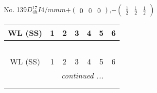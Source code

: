 \documentclass[fleqn,9pt,landscape]{jsarticle}
\begin{document}
\newpage
No. 139\quad$D_{4h}^{17}$\quad$I4/mmm$\quad[ tetragonal ]\quad$+\begin{pmatrix} 0 & 0 & 0 \end{pmatrix}$,\quad $+\begin{pmatrix} \frac{1}{2} & \frac{1}{2} & \frac{1}{2} \end{pmatrix}$
\begin{center}
\renewcommand{\arraystretch}{1.2}
\begin{longtable}{ccccccc}
 \hline \hline
WL (SS) & 1 & 2 & 3 & 4 & 5 & 6 \\ \hline \endfirsthead

\multicolumn{6}{l}{\tablename\ \thetable{}} \\
 \hline \hline
WL (SS) & 1 & 2 & 3 & 4 & 5 & 6 \\ \hline \endhead

 \hline \hline
\multicolumn{6}{r}{\footnotesize\it continued ...} \\ \endfoot

 \hline \hline
\multicolumn{6}{r}{} \\ \endlastfoot


\end{longtable}
\end{center}
\end{document}
